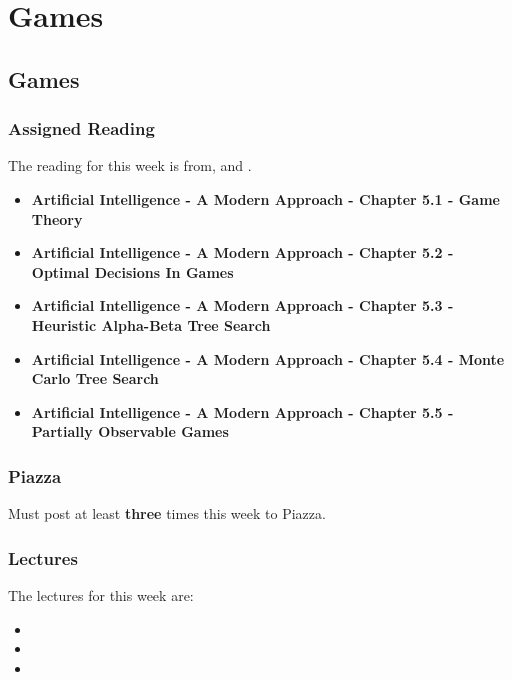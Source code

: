 \clearpage

\renewcommand{\ChapTitle}{Games}
\renewcommand{\SectionTitle}{Games}

\chapter{\ChapTitle}

\section{\SectionTitle}

\subsection{Assigned Reading}

The reading for this week is from, \AITextbook \hspace*{1pt} and \RLTextbook.

\begin{itemize}
    \item \textbf{Artificial Intelligence - A Modern Approach - Chapter 5.1 - Game Theory}
    \item \textbf{Artificial Intelligence - A Modern Approach - Chapter 5.2 - Optimal Decisions In Games}
    \item \textbf{Artificial Intelligence - A Modern Approach - Chapter 5.3 - Heuristic Alpha-Beta Tree Search}
    \item \textbf{Artificial Intelligence - A Modern Approach - Chapter 5.4 - Monte Carlo Tree Search}
    \item \textbf{Artificial Intelligence - A Modern Approach - Chapter 5.5 - Partially Observable Games}
\end{itemize}

\subsection{Piazza}

Must post at least \textbf{three} times this week to Piazza.

\subsection{Lectures}

The lectures for this week are:

\begin{itemize}
    \item {}
    \item {}
    \item {}
\end{itemize}

